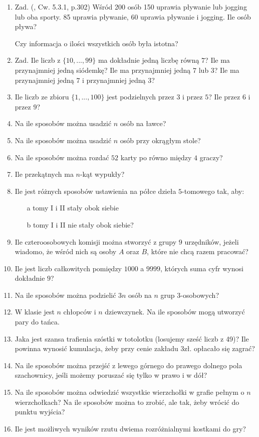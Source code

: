 \documentclass[12pt]{article}
\begin{document}
\begin{enumerate}
	\item 
	Zad. (\cite{MD}, Cw. 5.3.1, p.302)
	Wśród 200 osób 150 uprawia pływanie lub jogging lub oba sporty.
	85 uprawia pływanie, 60 uprawia pływanie i jogging. 
	Ile osób pływa?
	
	Czy informacja o ilości wszystkich osób była istotna?
	
	\item 
	Zad. 
	Ile liczb z $\{10, ..., 99\}$ ma dokładnie jedną liczbę równą $7$?
	Ile ma przynajmniej jedną siódemkę?
	Ile ma przynajmniej jedną $7$ lub $3$?
	Ile ma przynajmniej jedną $7$ i przynajmniej jedną $3$?
	
	\item 
	Ile liczb ze zbioru $\{1,...,100\}$ jest podzielnych przez $3$ i przez $5$?
	Ile przez $6$ i przez $9$?
	
	\item 
	 Na ile sposobów można usadzić $n$ osób na ławce?
	 \item 
	Na ile sposobów można usadzić $n$ osób przy okrągłym stole?
	\item  Na ile sposobów można rozdać $52$ karty po równo między $4$ graczy?
	\item Ile przekątnych ma $n$-kąt wypukły?
    \item Ile jest różnych sposobów ustawienia na półce dzieła $5$-tomowego tak, aby:
    \begin{itemize} 
	\item[a] tomy I i II stały obok siebie
	\item[b] tomy I i II nie stały obok siebie?
	\end{itemize} 
	\item Ile czteroosobowych komisji można stworzyć z grupy $9$ urzędników, jeżeli
	wiadomo, że wśród nich są osoby $A$ oraz $B$, które nie chcą razem pracować?
	\item Ile jest liczb całkowitych pomiędzy $1000$ a $9999$, których suma cyfr wynosi
	dokładnie $9$?
	\item  Na ile sposobów można podzielić $3n$ osób na $n$ grup $3$-osobowych?
	\item W klasie jest $n$ chłopców i $n$ dziewczynek. Na ile sposobów mogą utworzyć pary do tańca. 
	\item Jaka jest szansa trafienia szóstki w totolotku (losujemy sześć liczb z 49)? Ile powinna wynosić kumulacja, 
	 żeby przy cenie zakładu 3zł. opłacało się zagrać?
    \item Na ile sposobów można przejść z lewego górnego do prawego dolnego pola szachownicy, jeśli możemy poruszać się
    tylko w prawo i w dół?
    \item Na ile sposobów można odwiedzić wszystkie wierzchołki
    w grafie pełnym o $n$ wierzchołkach? 
    Na ile sposobów można to zrobić, ale tak, żeby wrócić do punktu wyjścia?
    \item Ile jest możliwych wyników rzutu dwiema rozróżnialnymi 
    kostkami do gry?
    

\end{enumerate}
\end{document}
